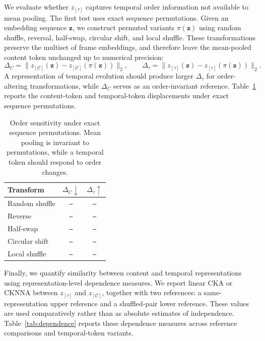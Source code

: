 \documentclass{article}
\newcommand{\zseq}{\mathbf{z}}          %
\newcommand{\zC}{z_{[\mathcal{C}]}}    %
\newcommand{\ztau}{z_{[\tau]}}          %
\newcommand{\res}{\texttt{--}}
\begin{document}
We evaluate whether $\ztau$ captures temporal order information not
available to mean pooling.  The first test uses exact sequence
permutations.  Given an embedding sequence $\zseq$, we construct
permuted variants $\pi(\zseq)$ using random shuffle, reversal,
half-swap, circular shift, and local shuffle.  These transformations
preserve the multiset of frame embeddings, and therefore leave the
mean-pooled content token unchanged up to numerical precision:
%
\begin{equation}
  \Delta_C
  =
  \|\zC(\zseq)-\zC(\pi(\zseq))\|_2,
  \qquad
  \Delta_\tau
  =
  \|\ztau(\zseq)-\ztau(\pi(\zseq))\|_2.
  \label{eq:order_sensitivity}
\end{equation}
%
A representation of temporal evolution should produce larger
$\Delta_\tau$ for order-altering transformations, while $\Delta_C$
serves as an order-invariant reference.  Table~\ref{tab:order_sensitivity}
reports the content-token and temporal-token displacements under
exact sequence permutations.

\begin{table}[t]
  \centering
  \setlength{\tabcolsep}{5.0pt}
  \caption{Order sensitivity under exact sequence permutations.  Mean
    pooling is invariant to permutations, while a temporal token should
  respond to order changes.}
  \label{tab:order_sensitivity}
  \begin{tabular}{lcc}
    \toprule
    \textbf{Transform}
    & $\Delta_C\downarrow$
    & $\Delta_\tau\uparrow$ \\
    \midrule
    Random shuffle & \res & \res \\
    Reverse & \res & \res \\
    Half-swap & \res & \res \\
    Circular shift & \res & \res \\
    Local shuffle & \res & \res \\
    \bottomrule
  \end{tabular}
\end{table}

Finally, we quantify similarity between content and temporal
representations using representation-level dependence measures.  We
report linear CKA or CKNNA between $\ztau$ and $\zC$, together with
two references: a same-representation upper reference and a
shuffled-pair lower reference.  These values are used comparatively
rather than as absolute estimates of independence.
Table~\ref{tab:dependence} reports these dependence measures across
reference comparisons and temporal-token variants.
\end{document}
